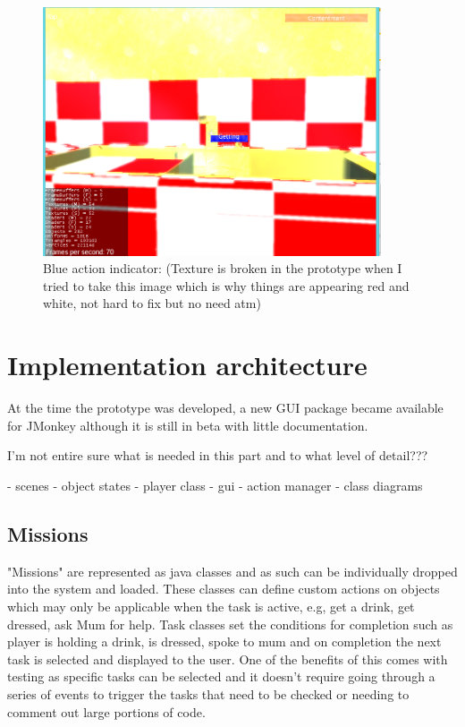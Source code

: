 \documentclass[11pt]{report}
\begin{document}
\begin{figure}[H]
\centering
\includegraphics[width=100mm]{images/prototype/actionindicator.png}
\caption{Blue action indicator: (Texture is broken in the prototype when I tried to take this image which is why things are appearing red and white, not hard to fix but no need atm)}
\label{prototype_actionindicator}
\end{figure}

\section{Implementation architecture}
At the time the prototype was developed, a new GUI package became available for JMonkey although it is still in beta with little documentation. 

I'm not entire sure what is needed in this part and to what level of detail???

- scenes
- object states
- player class
- gui
- action manager
- class diagrams

\subsection{Missions}
"Missions" are represented as java classes and as such can be individually dropped into the system and loaded. These classes can define custom actions on objects which may only be applicable when the task is active, e.g, get a drink, get dressed, ask Mum for help. Task classes set the conditions for completion such as player is holding a drink, is dressed, spoke to mum and on completion the next task is selected and displayed to the user. One of the benefits of this comes with testing as specific tasks can be selected and it doesn't require going through a series of events to trigger the tasks that need to be checked or needing to comment out large portions of code.
\end{document}
